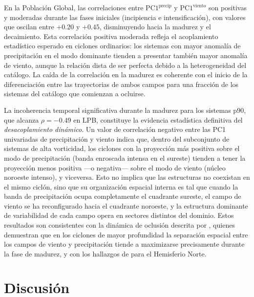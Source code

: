

En la Población Global, las correlaciones entre $\text{PC1}^{\text{precip}}$ y $\text{PC1}^{\text{viento}}$ son positivas y moderadas durante las fases iniciales (incipiencia e intensificación), con valores que oscilan entre $+0.20$ y $+0.45$, disminuyendo hacia la madurez y el decaimiento. Esta correlación positiva moderada refleja el acoplamiento estadístico esperado en ciclones ordinarios: los sistemas con mayor anomalía de precipitación en el modo dominante tienden a presentar también mayor anomalía de viento, aunque la relación dista de ser perfecta debido a la heterogeneidad del catálogo. La caída de la correlación en la madurez es coherente con el inicio de la diferenciación entre las trayectorias de ambos campos para una fracción de los sistemas del catálogo que comienzan a ocluirse.

La incoherencia temporal significativa durante la madurez para los sistemas p90, que alcanza $\rho = -0.49$ en LPB, constituye la evidencia estadística definitiva del \textit{desacoplamiento dinámico}. Un valor de correlación negativo entre las PC1 univariadas de precipitación y viento indica que, dentro del subconjunto de sistemas de alta vorticidad, los ciclones con la proyección más positiva sobre el modo de precipitación (banda enroscada intensa en el sureste) tienden a tener la proyección menos positiva ---o negativa--- sobre el modo de viento (núcleo noroeste intenso), y viceversa. Esto no implica que las estructuras no coexistan en el mismo ciclón, sino que su organización espacial interna es tal que cuando la banda de precipitación ocupa completamente el cuadrante sureste, el campo de viento se ha reconfigurado hacia el cuadrante noroeste, y la estructura dominante de variabilidad de cada campo opera en sectores distintos del dominio. Estos resultados son consistentes con la dinámica de oclusión descrita por \citet{sinclair2023relationship}, quienes demuestran que en los ciclones de mayor profundidad la separación espacial entre los campos de viento y precipitación tiende a maximizarse precisamente durante la fase de madurez, y con los hallazgos de \citet{chen2025characteristics} para el Hemisferio Norte.

\section{Discusión}
\label{sec:discusion_meof}

